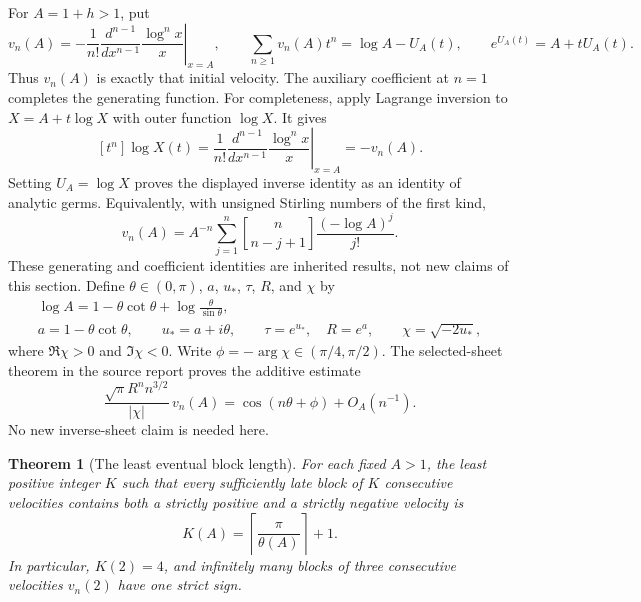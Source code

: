 \documentclass[11pt,a4paper]{article}
\numberwithin{equation}{section}
\newtheorem{theorem}{Theorem}[section]
\theoremstyle{definition}
\theoremstyle{remark}
\begin{document}
For $A=1+h>1$, put
\[
 v_n(A)=-\frac1{n!}\left.\frac{d^{n-1}}{dx^{n-1}}
               \frac{\log^n x}{x}\right|_{x=A},
 \qquad
 \sum_{n\geq1}v_n(A)t^n=\log A-U_A(t),
 \qquad e^{U_A(t)}=A+tU_A(t).
\]
Thus $v_n(A)$ is exactly that initial velocity.  The auxiliary
coefficient at $n=1$ completes the generating function.  For completeness,
apply Lagrange inversion \cite{Gessel} to $X=A+t\log X$ with outer function
$\log X$.  It gives
\[
 [t^n]\log X(t)=\frac1{n!}
       \left.\frac{d^{n-1}}{dx^{n-1}}
                \frac{\log^n x}{x}\right|_{x=A}=-v_n(A).
\]
Setting $U_A=\log X$ proves the displayed inverse identity as an
identity of analytic germs.  Equivalently, with unsigned Stirling
numbers of the first kind,
\[
 v_n(A)=A^{-n}\sum_{j=1}^n
             \genfrac{[}{]}{0pt}{}{n}{n-j+1}\frac{(-\log A)^j}{j!}.
\]
These generating and coefficient identities are inherited results,
not new claims of this section.  Define $\theta\in(0,\pi)$, $a$, $u_*$,
$\tau$, $R$, and $\chi$ by
\begin{gather*}
 \log A=1-\theta\cot\theta+
       \log\frac{\theta}{\sin\theta},\\
 a=1-\theta\cot\theta,
 \qquad u_*=a+i\theta,
 \qquad \tau=e^{u_*},\quad R=e^a,
 \qquad \chi=\sqrt{-2u_*},
\end{gather*}
where $\Re\chi>0$ and $\Im\chi<0$.  Write
$\phi=-\arg\chi\in(\pi/4,\pi/2)$.  The selected-sheet theorem in
the source report proves the additive estimate
\begin{equation}\label{newdiag:eq:cosine}
 \frac{\sqrt\pi R^n n^{3/2}}{|\chi|}\,v_n(A)
       =\cos(n\theta+\phi)+O_A(n^{-1}).
\end{equation}
No new inverse-sheet claim is needed here.

\begin{theorem}[The least eventual block length]
\label{newdiag:thm:sharp-block}
For each fixed $A>1$, the least positive integer $K$ such that every
sufficiently late block of $K$ consecutive velocities contains both a
strictly positive and a strictly negative velocity is
\begin{equation}\label{newdiag:eq:sharp-K}
 K(A)=\left\lceil\frac\pi{\theta(A)}\right\rceil+1.
\end{equation}
In particular, $K(2)=4$, and infinitely many blocks of three
consecutive velocities $v_n(2)$ have one strict sign.
\end{theorem}
\end{document}
